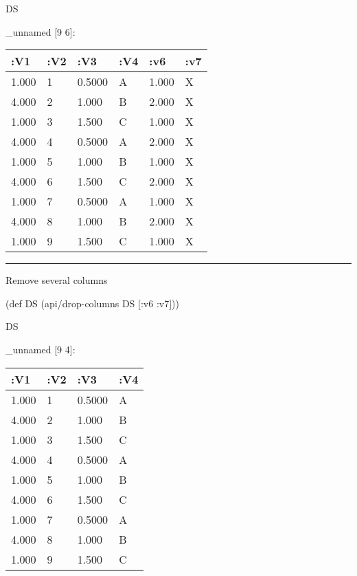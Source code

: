 \documentclass[]{article}
\newenvironment{Shaded}{\begin{snugshade}}{\end{snugshade}}
\newcommand{\FunctionTok}[1]{\textcolor[rgb]{0.00,0.00,0.00}{#1}}
\newcommand{\BuiltInTok}[1]{#1}
\newcommand{\AttributeTok}[1]{\textcolor[rgb]{0.77,0.63,0.00}{#1}}
\newcommand{\NormalTok}[1]{#1}
\begin{document}
\begin{Shaded}
\begin{Highlighting}[]
\NormalTok{DS}
\end{Highlighting}
\end{Shaded}

\_unnamed {[}9 6{]}:

\begin{longtable}[]{@{}llllll@{}}
\toprule
:V1 & :V2 & :V3 & :V4 & :v6 & :v7\tabularnewline
\midrule
\endhead
1.000 & 1 & 0.5000 & A & 1.000 & X\tabularnewline
4.000 & 2 & 1.000 & B & 2.000 & X\tabularnewline
1.000 & 3 & 1.500 & C & 1.000 & X\tabularnewline
4.000 & 4 & 0.5000 & A & 2.000 & X\tabularnewline
1.000 & 5 & 1.000 & B & 1.000 & X\tabularnewline
4.000 & 6 & 1.500 & C & 2.000 & X\tabularnewline
1.000 & 7 & 0.5000 & A & 1.000 & X\tabularnewline
4.000 & 8 & 1.000 & B & 2.000 & X\tabularnewline
1.000 & 9 & 1.500 & C & 1.000 & X\tabularnewline
\bottomrule
\end{longtable}

\begin{center}\rule{0.5\linewidth}{0.5pt}\end{center}

Remove several columns

\begin{Shaded}
\begin{Highlighting}[]
\NormalTok{(}\BuiltInTok{def}\FunctionTok{ DS }\NormalTok{(api/drop-columns DS [}\AttributeTok{:v6} \AttributeTok{:v7}\NormalTok{]))}
\end{Highlighting}
\end{Shaded}

\begin{Shaded}
\begin{Highlighting}[]
\NormalTok{DS}
\end{Highlighting}
\end{Shaded}

\_unnamed {[}9 4{]}:

\begin{longtable}[]{@{}llll@{}}
\toprule
:V1 & :V2 & :V3 & :V4\tabularnewline
\midrule
\endhead
1.000 & 1 & 0.5000 & A\tabularnewline
4.000 & 2 & 1.000 & B\tabularnewline
1.000 & 3 & 1.500 & C\tabularnewline
4.000 & 4 & 0.5000 & A\tabularnewline
1.000 & 5 & 1.000 & B\tabularnewline
4.000 & 6 & 1.500 & C\tabularnewline
1.000 & 7 & 0.5000 & A\tabularnewline
4.000 & 8 & 1.000 & B\tabularnewline
1.000 & 9 & 1.500 & C\tabularnewline
\bottomrule
\end{longtable}
\end{document}
